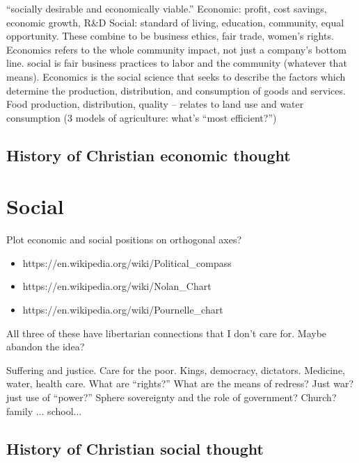 \documentclass[12pt]{article}
\begin{document}
``socially desirable and economically viable.''
Economic: profit, cost savings, economic growth, R\&D
Social: standard of living, education, community, equal opportunity. These combine to be business ethics, fair trade, women's rights.
Economics refers to the whole community impact, not just a company's bottom line.
social is fair business practices to labor and the community (whatever that means).
Economics is the social science that seeks to describe the factors which determine the production, distribution, and consumption of goods and services.
Food production, distribution, quality -- relates to land use and water consumption (3 models of agriculture: what's ``most efficient?'')


\subsection{History of Christian economic thought}
\label{sec:economic_history}



\section{Social}
\label{sec:social}

Plot economic and social positions on orthogonal axes?
\begin{itemize}
\item{https://en.wikipedia.org/wiki/Political\_compass}
\item{https://en.wikipedia.org/wiki/Nolan\_Chart}
\item{https://en.wikipedia.org/wiki/Pournelle\_chart}
\end{itemize}
All three of these have libertarian connections that I don't care for. Maybe abandon the idea?

Suffering and justice. Care for the poor. 
Kings, democracy, dictators.
Medicine, water, health care. What are ``rights?''
What are the means of redress?
Just war? just use of ``power?''
Sphere sovereignty and the role of government? Church? family ... school...


\subsection{History of Christian social thought}
\label{sec:social_history}
\end{document}
